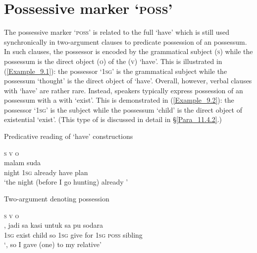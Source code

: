 \section{Possessive marker  ‘\textsc{poss}’}
\label{Para_9.1}
The possessive marker  ‘\textsc{poss}’ is related to the full    ‘have’ which is still used synchronically in two-argument clauses to predicate possession of an  possessum. In such clauses, the possessor is encoded by the grammatical subject (\textsc{s}) while the  possessum is the direct object (\textsc{o}) of the  (\textsc{v})  ‘have’. This is illustrated in (\ref{Example_9.1}): the possessor  ‘1\textsc{sg}’ is the grammatical subject while the possessum  ‘thought’ is the direct object of  ‘have’. Overall, however, verbal clauses with  ‘have’ are rather rare. Instead, speakers typically express possession of an  possessum with a  with  ‘exist’. This is demonstrated in (\ref{Example_9.2}): the possessor  ‘\textsc{1sg}’ is the subject while the  possessum  ‘child’ is the direct object of existential  ‘exist’. (This type of  is discussed in detail in §\ref{Para_11.4.2}.)



\begin{styleExampleTitle}
Predicative reading of  ‘have’ constructions
\end{styleExampleTitle}
\ea
\label{Example_9.1}
\glll {} {\textsc{s}}  {}  {\textsc{v}} {\textsc{o}}\\ %
{malam}  {}  {suda}  {}  {}\\
 {night}  {\textsc{1sg}}  {already}  {have}  {plan}\\
\glt ‘the night (before I go hunting)  already ’ \textstyleExampleSource{[080919-004-NP.0002]}
\z


\begin{styleExampleTitle}
Two-argument  denoting possession
\end{styleExampleTitle}

\ea
\label{Example_9.2}
\glll \textsc{s} \textsc{v} \textsc{o}\\ %
{}  {}  {},  {jadi}  {sa}  {kasi}  {untuk}  {sa}  {pu}  {sodara}\\
 {\textsc{1sg}}  {exist}  {child}  {so}  {\textsc{1sg}}  {give}  {for}  {\textsc{1sg}}  {\textsc{poss}}  {sibling}\\
\glt 
‘, so I gave (one) to my relative’ \textstyleExampleSource{[081006-024-CvEx.0010]}
\z


